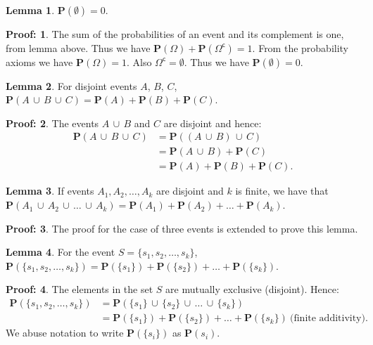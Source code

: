 \documentclass[11pt]{amsart}
\theoremstyle{definition} \newtheorem{thm}{Theorem:} \theoremstyle{plain}
\theoremstyle{definition} \newtheorem*{nnthm}{Theorem:} \theoremstyle{plain}
\theoremstyle{definition} \newtheorem{lem}{Lemma} \theoremstyle{plain}
\theoremstyle{definition} \newtheorem*{nnlem}{Lemma:} \theoremstyle{plain}
\theoremstyle{definition} \newtheorem{prf}{Proof:} \theoremstyle{plain}
\theoremstyle{definition} \newtheorem*{nnprf}{Proof:} \theoremstyle{plain}
\theoremstyle{definition} \newtheorem{eg}{Example:} \theoremstyle{plain}
\theoremstyle{definition} \newtheorem*{sol}{Solution:} \theoremstyle{plain}
\newcommand{\setcomp}[1]{{#1}^{\mathsf{c}}}
\newcommand{\prob}[1]{\mathbf{P}(#1)}
\newcommand{\twocup}[2]{{#1} \,\cup\, {#2}}
\newcommand{\threecup}[3]{{#1} \,\cup\, {#2} \,\cup\, {#3}}
\newcommand{\fourcup}[4]{{#1} \,\cup\, {#2} \,\cup\, {#3} \,\cup\, {#4}}
\newcommand{\sngltn}[1]{\{ {#1} \}}
\begin{document}
\begin{lem}
$\prob{\emptyset} = 0$.
\end{lem}
\begin{nnprf}
The sum of the probabilities of an event and its complement is one, from lemma 
above. Thus we have $\prob{\Omega} + \prob{\setcomp{\Omega}} = 1$. From the 
probability axioms we have $\prob{\Omega} = 1$. 
Also $\setcomp{\Omega} = \emptyset$. Thus we have $\prob{\emptyset} = 0$.
\end{nnprf}

\begin{lem}
For disjoint events $A$, $B$, $C$, 
$\prob{\threecup{A}{B}{C}} = \prob{A} + \prob{B} + \prob{C}$.
\end{lem}
\begin{nnprf}
The events $\twocup{A}{B}$ and $C$ are disjoint and hence:
\begin{align*}
\prob{\threecup{A}{B}{C}} & = \prob{\twocup{(\twocup{A}{B})}{C}} \\
                          & = \prob{\twocup{A}{B}} + \prob{C} \\
                          & = \prob{A} + \prob{B} + \prob{C}.
\end{align*}
\end{nnprf}
 

\begin{lem}
If events $A_1, A_2, \ldots, A_k$ are disjoint and $k$ is finite, we have that 
$\prob{\fourcup{A_1}{A_2}{\ldots}{A_k}} = 
\prob{A_1} + \prob{A_2} + \ldots + \prob{A_k}$.
\end{lem}
\begin{nnprf}
The proof for the case of three events is extended to prove this lemma. 
\end{nnprf}

\begin{lem}
For the event $S = \{ s_1, s_2, \ldots, s_k\}$,
$\prob{\{ s_1, s_2, \dots, s_k\}} = \prob{\sngltn{s_1}} + 
\prob{\sngltn{s_2}} + \ldots + \prob{\sngltn{s_k}}$.
\end{lem}
\begin{nnprf}
The elements in the set $S$ are mutually exclusive (disjoint). Hence:
\begin{align*}
\prob{\{ s_1, s_2, \dots, s_k\}} & = 
\prob{\fourcup{\sngltn{s_1}}{\sngltn{s_2}}{\ldots}{\sngltn{s_k}}} \\
& = \prob{\sngltn{s_1}} + \prob{\sngltn{s_2}} + 
    \ldots + \prob{\sngltn{s_k}}~\mbox{(finite additivity)}.
\end{align*} 
We abuse notation to write $\prob{\sngltn{s_i}}$ as $\prob{s_i}$.
\end{nnprf}
\end{document}

